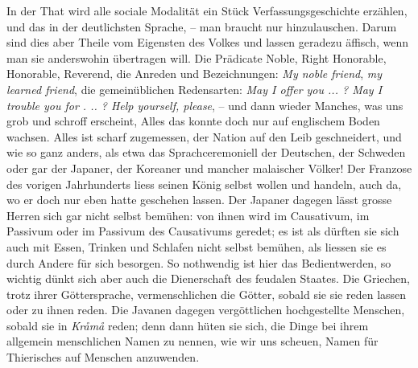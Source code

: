 In der That wird alle sociale Modalität ein Stück Verfassungsgeschichte erzählen, und das in der deutlichsten Sprache, – man braucht nur hinzulauschen. Darum sind dies aber Theile vom Eigensten des Volkes und lassen geradezu äffisch, wenn man sie anderswohin übertragen will. Die Prädicate Noble, Right Honorable, Honorable, Reverend, die Anreden und Bezeichnungen: \textit{My noble friend}, \textit{my learned friend}, die gemeinüblichen Redensarten: \textit{May I offer you ... ? May I trouble you for . .. ? Help yourself, please}, – und dann wieder \label{sp.475} Manches, was uns grob und schroff erscheint, Alles das konnte doch nur auf englischem Boden wachsen. Alles ist scharf zugemessen, der Nation auf den Leib geschneidert, und wie so ganz anders, als etwa das Sprachceremoniell der Deutschen, der Schweden oder gar der Japaner, der Koreaner und mancher malaischer Völker! Der Franzose des vorigen Jahrhunderts liess seinen König selbst wollen und handeln, auch da, wo er doch nur eben hatte geschehen lassen. Der Japaner dagegen lässt grosse Herren sich gar nicht selbst bemühen: von ihnen wird im Causativum, im Passivum oder im Passivum des Causativums geredet; es ist als dürften sie sich auch mit Essen, Trinken und Schlafen nicht selbst bemühen, als liessen sie es durch Andere für sich besorgen.  So nothwendig ist hier das Bedientwerden, so wichtig dünkt sich aber auch die Dienerschaft des feudalen Staates. Die Griechen, trotz ihrer Göttersprache, \label{fp.457} vermenschlichen die Götter, sobald sie sie reden lassen oder zu ihnen reden.  Die Javanen dagegen vergöttlichen hochgestellte Menschen, sobald sie in \textit{Kråmå} reden; denn dann hüten sie sich, die Dinge bei ihrem allgemein menschlichen Namen zu nennen, wie wir uns scheuen, Namen für Thierisches auf Menschen anzuwenden.

\subsection*{}

